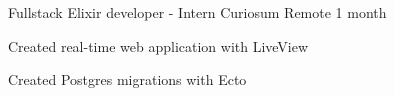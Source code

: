 

\begin{cventries}

  \cventry
    {Fullstack Elixir developer - Intern} %
    {Curiosum} %
    {Remote} %
    {1 month} %
    {
      \begin{cvitems} %
        \item {Created real-time web application with LiveView}
        \item {Created Postgres migrations with Ecto}
      \end{cvitems}
    }

\end{cventries}
